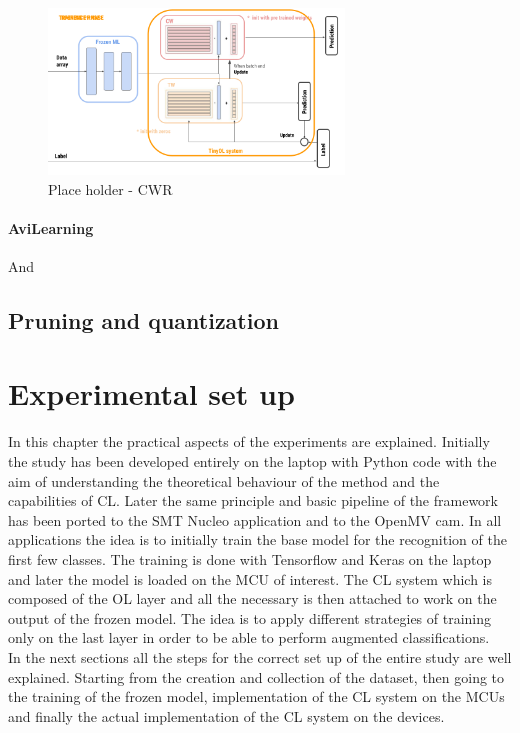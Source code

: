 \documentclass[12pt]{report}
\begin{document}
%
\begin{figure}[h!]
    \centering
    \includegraphics[width=0.7\textwidth]{Figures/Chapter3/CWR.png} 
    \caption{Place holder - CWR}
    \label{fig:block_diag_CWR}    
\end{figure}
%
\subsubsection{AviLearning}





And

\section{Pruning and quantization}





\chapter{Experimental set up}

In this chapter the practical aspects of the experiments are explained. Initially the study has been developed entirely on the laptop with Python code with the aim of understanding the theoretical behaviour of the method and the capabilities of CL. Later the same principle and basic pipeline of the framework has been ported to the SMT Nucleo application and to the OpenMV cam. In all applications the idea is to initially train the base model for the recognition of the first few classes. The training is done with Tensorflow and Keras on the laptop and later the model is loaded on the MCU of interest. The CL system which is composed of the OL layer and all the necessary is then attached to work on the output of the frozen model. The idea is to apply different strategies of training only on the last layer in order to be able to perform augmented classifications.  \\
In the next sections all the steps for the correct set up of the entire study are well explained. Starting from the creation and collection of the dataset, then going to the training of the frozen model, implementation of the CL system on the MCUs and finally the actual implementation of the CL system on the devices. 
\end{document}
